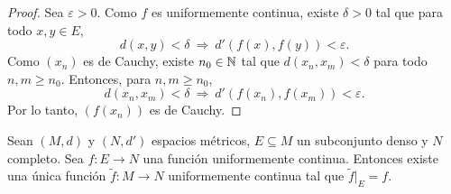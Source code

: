 \begin{proof}
Sea $\varepsilon>0$. Como $f$ es uniformemente continua, existe $\delta>0$
tal que para todo $x,y\in E$,
\[
d(x,y)<\delta \ \Rightarrow\ d'(f(x),f(y))<\varepsilon.
\]
Como $(x_n)$ es de Cauchy, existe $n_0\in\mathbb{N}$ tal que $d(x_n,x_m)<\delta$
para todo $n,m\ge n_0$. Entonces, para $n,m\ge n_0$,
\[
d(x_n,x_m)<\delta \ \Rightarrow\ d'(f(x_n),f(x_m))<\varepsilon.
\]
Por lo tanto, $(f(x_n))$ es de Cauchy.
\end{proof}

\begin{teo}
Sean $(M,d)$ y $(N,d')$ espacios métricos, $E \subseteq M$ un subconjunto
denso y $N$ completo. Sea $f : E \to N$ una función uniformemente
continua. Entonces existe una única función $\tilde f : M \to N$
uniformemente continua tal que $\tilde f|_E = f$.
\end{teo}

